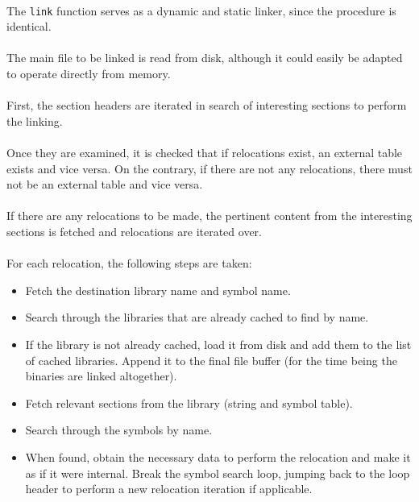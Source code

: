 \documentclass[12pt]{article}
\begin{document}
	\paragraph{}The \verb|link| function serves as a dynamic and static linker, since the procedure is identical.
	\paragraph{}The main file to be linked is read from disk, although it could easily be adapted to operate directly from memory.
	\paragraph{}First, the section headers are iterated in search of interesting sections to perform the linking.
	\paragraph{}Once they are examined, it is checked that if relocations exist, an external table exists and vice versa. On the contrary, if there are not any relocations, there must not be an external table and vice versa.
	\paragraph{}If there are any relocations to be made, the pertinent content from the interesting sections is fetched and relocations are iterated over.
	\paragraph{}For each relocation, the following steps are taken:
	\begin{itemize}
		\item Fetch the destination library name and symbol name.
		\item Search through the libraries that are already cached to find by name.
		\item If the library is not already cached, load it from disk and add them to the list of cached libraries. Append it to the final file buffer (for the time being the binaries are linked altogether).
		\item Fetch relevant sections from the library (string and symbol table).
		\item Search through the symbols by name.
		\item When found, obtain the necessary data to perform the relocation and make it as if it were internal. Break the symbol search loop, jumping back to the loop header to perform a new relocation iteration if applicable.
	\end{itemize}
	
\end{document}
